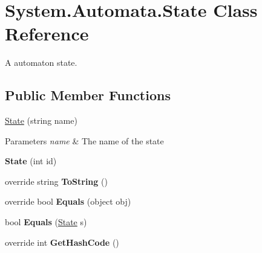 \hypertarget{class_system_1_1_automata_1_1_state}{}\section{System.\+Automata.\+State Class Reference}
\label{class_system_1_1_automata_1_1_state}


A automaton state.  


\subsection*{Public Member Functions}
\begin{DoxyCompactItemize}
\item 
\mbox{\label{class_system_1_1_automata_1_1_state_a6e1833f9d456c0badab1ebc2dd3f9025}} 
\mbox{\hyperlink{class_system_1_1_automata_1_1_state_a6e1833f9d456c0badab1ebc2dd3f9025}{State}} (string name)
\begin{DoxyCompactList}\small\item\em 
\begin{DoxyParams}{Parameters}
{\em name} & The name of the state\\
\hline
\end{DoxyParams}
\end{DoxyCompactList}\item 
\mbox{\label{class_system_1_1_automata_1_1_state_aea35e79d24a3f3e90dcc1ced6fbd3d01}} 
{\bfseries State} (int id)
\item 
\mbox{\label{class_system_1_1_automata_1_1_state_a0a0e694af6779817fa041051e696211d}} 
override string {\bfseries To\+String} ()
\item 
\mbox{\label{class_system_1_1_automata_1_1_state_afa96677a72c07d002a4a775ed855db41}} 
override bool {\bfseries Equals} (object obj)
\item 
\mbox{\label{class_system_1_1_automata_1_1_state_ad125b073a92a6aa475abdebaf9b84e4b}} 
bool {\bfseries Equals} (\mbox{\hyperlink{class_system_1_1_automata_1_1_state}{State}} s)
\item 
\mbox{\label{class_system_1_1_automata_1_1_state_a36f73edad3f050e26a4df64d82322587}} 
override int {\bfseries Get\+Hash\+Code} ()
\end{DoxyCompactItemize}
